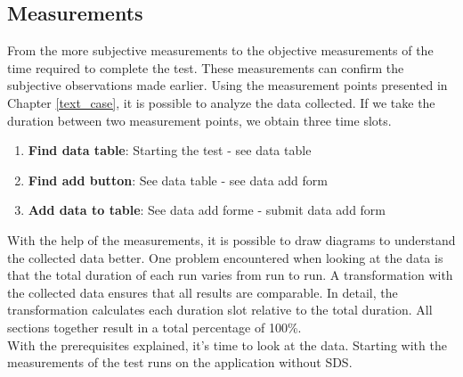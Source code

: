 \subsection{Measurements}
From the more subjective measurements to the objective measurements of the time required to complete the test. These measurements can confirm the subjective observations made earlier. Using the measurement points presented in Chapter \ref{text_case}, it is possible to analyze the data collected. If we take the duration between two measurement points, we obtain three time slots. 
\begin{enumerate}
    \item \textbf{Find data table}: Starting the test - see data table
    \item \textbf{Find add button}: See data table - see data add form
    \item \textbf{Add data to table}: See data add forme - submit data add form
\end{enumerate}
With the help of the measurements, it is possible to draw diagrams to understand the collected data better. One problem encountered when looking at the data is that the total duration of each run varies from run to run. A transformation with the collected data ensures that all results are comparable. In detail, the transformation calculates each duration slot relative to the total duration. All sections together result in a total percentage of 100\%. \\

With the prerequisites explained, it's time to look at the data. Starting with the measurements of the test runs on the application without \ac{SDS}.\\

